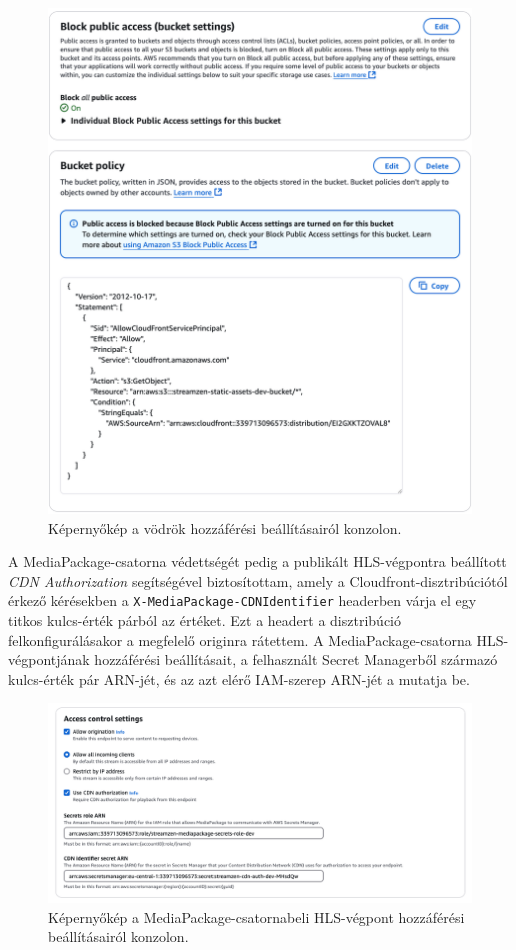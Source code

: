 \begin{figure}[ht]
  \centering
  \includegraphics[width=150mm, keepaspectratio]{figures/distro_s3policy.png}
  \caption{Képernyőkép a vödrök hozzáférési beállításairól konzolon.}
  \label{fig:s3policy}
\end{figure}

A MediaPackage-csatorna védettségét pedig a publikált HLS-végpontra beállított \emph{CDN Authorization}\cite{cdnauth} segítségével biztosítottam, amely a Cloudfront-disztribúciótól érkező kérésekben a \verb|X-MediaPackage-CDNIdentifier| headerben várja el egy titkos kulcs-érték párból az értéket. Ezt a headert a disztribúció felkonfigurálásakor a megfelelő originra rátettem. A MediaPackage-csatorna HLS-végpontjának hozzáférési beállításait, a felhasznált Secret Managerből származó kulcs-érték pár ARN-jét, és az azt elérő IAM-szerep ARN-jét a  mutatja be.

\begin{figure}[ht]
  \centering
  \includegraphics[width=150mm, keepaspectratio]{figures/distro_mediapack.png}
  \caption{Képernyőkép a MediaPackage-csatornabeli HLS-végpont hozzáférési beállításairól konzolon.}
  \label{fig:mediapack}
\end{figure}


